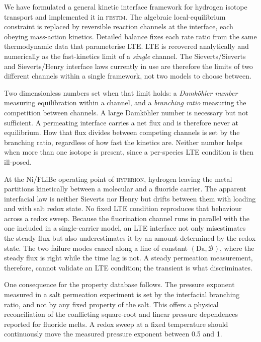\documentclass[5p]{elsarticle}
\newcommand{\FESTIM}{\textsc{festim}}
\newcommand{\HYPERION}{\textsc{hyperion}}
\newcommand{\Da}{\mathrm{Da}}
\newcommand{\Bra}{\mathcal{B}}             %
\begin{document}
We have formulated a general kinetic interface framework for hydrogen isotope transport and implemented it in \FESTIM{}.
The algebraic local-equilibrium constraint is replaced by reversible reaction channels at the interface, each obeying mass-action kinetics.
Detailed balance fixes each rate ratio from the same thermodynamic data that parameterise LTE.
LTE is recovered analytically and numerically as the fast-kinetics limit of a \emph{single} channel.
The Sieverts/Sieverts and Sieverts/Henry interface laws currently in use are therefore the limits of two different channels within a single framework, not two models to choose between.

Two dimensionless numbers set when that limit holds: a \emph{Damk\"ohler number} measuring equilibration within a channel, and a \emph{branching ratio} measuring the competition between channels.
A large Damk\"ohler number is necessary but not sufficient.
A permeating interface carries a net flux and is therefore never at equilibrium.
How that flux divides between competing channels is set by the branching ratio, regardless of how fast the kinetics are.
Neither number helps when more than one isotope is present, since a per-species LTE condition is then ill-posed.

At the Ni/FLiBe operating point of \HYPERION{}, hydrogen leaving the metal partitions kinetically between a molecular and a fluoride carrier.
The apparent interfacial law is neither Sieverts nor Henry but drifts between them with loading and with salt redox state.
No fixed LTE condition reproduces that behaviour across a redox sweep.
Because the fluorination channel runs in parallel with the one included in a single-carrier model, an LTE interface not only misestimates the steady flux but also underestimates it by an amount determined by the redox state.
The two failure modes cancel along a line of constant $(\Da, \Bra)$, where the steady flux is right while the time lag is not.
A steady permeation measurement, therefore, cannot validate an LTE condition; the transient is what discriminates.

One consequence for the property database follows.
The pressure exponent measured in a salt permeation experiment is set by the interfacial branching ratio, and not by any fixed property of the salt.
This offers a physical reconciliation of the conflicting square-root and linear pressure dependences reported for fluoride melts.
A redox sweep at a fixed temperature should continuously move the measured pressure exponent between 0.5 and 1.
\end{document}
